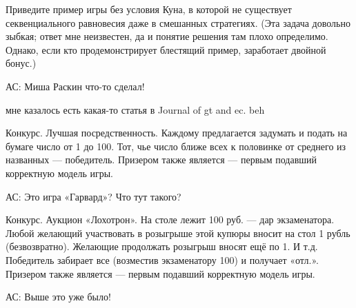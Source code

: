 \begin{problem}
 Приведите пример игры без условия Куна, в которой не существует секвенциального равновесия даже в смешанных стратегиях. (Эта задача довольно зыбкая; ответ мне неизвестен, да и понятие решения там плохо определимо. Однако, если кто продемонстрирует блестящий пример, заработает двойной бонус.)

{\red АС: Миша Раскин что-то сделал!}

\begin{source}
\cite{savva:nmu}
\end{source}


\begin{sol}
мне казалось есть какая-то статья в Journal of gt and ec. beh
\end{sol}
\end{problem}







\begin{problem}
Конкурс. Лучшая посредственность. Каждому предлагается задумать и подать на
бумаге число от 1 до 100. Тот, чье число ближе всех
к половинке от среднего из названных — победитель.
Призером также является — первым подавший
корректную модель игры.

{\red АС: Это игра «Гарвард»? Что тут такого?}


\begin{sol}

\end{sol}
\end{problem}




\begin{problem}[«Лохотрон-??»]
 Конкурс. Аукцион «Лохотрон». На столе лежит 100 руб. — дар
экзаменатора. Любой желающий участвовать в
розыгрыше этой купюры вносит на стол 1 рубль
(безвозвратно). Желающие продолжать розыгрыш вносят
ещё по 1. И т.д. Победитель забирает все (возместив
экзаменатору 100) и получает «отл.». Призером также
является — первым подавший корректную модель игры.

{\red АС:  Выше это уже было!}


\begin{sol}

\end{sol}
\end{problem}



